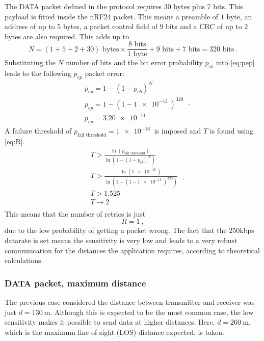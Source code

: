 The DATA packet defined in the protocol requires $30$ bytes plus $7$ bits. This payload is fitted inside the nRF24 packet. This means a preamble of $1$ byte, an address of up to $5$ bytes, a packet control field of $9$ bits and a CRC of up to $2$ bytes are also required. This adds up to
\begin{equation}
	N = \left( 1 + 5 + 2  + 30 \right)  \text{ bytes} \times \frac{8 \text{ bits}}{1 \text{ byte}} + 9 \text{ bits} + 7 \text{ bits} = 320 \text{ bits} \ .
\end{equation}
Substituting the $N$ number of bits and the bit error probability $p_{eb}$ into \eqref{eq:pep} leads to the following $p_{ep}$ packet error:
\begin{equation}
	\begin{split}
		& p_{ep} = 1 - \left( 1 - p_{eb} \right)^N \\
		& p_{ep} = 1 - \left( 1 - \SI{1e-13}{} \right)^{320} \\
		& p_{ep} = \SI{3.20e-11}{}
	\end{split} \ .
\end{equation}
A failure threshold of $p_{\text{fail threshold}} = \SI{1e-16}{}$ is imposed and $T$ is found using \eqref{eq:R}.
\begin{equation}
	\begin{split}
		& T > \frac{\ln \left( p_{\text{fail threshold}}  \right) }{\ln \left( 1 - \left( 1 - p_{eb} \right)^N \right) } \\
		& T > \frac{\ln \left( \SI{1e-16}{} \right) }{\ln \left( 1 - \left( 1 - \SI{1e-13}{} \right)^{320} \right) } \\
		& T > 1.525 \\
		& T \rightarrow 2 \\
	\end{split} \ .
\end{equation}
This means that the number of retries is just
\begin{equation}
	R = 1 \ ,
\end{equation}
due to the low probability of getting a packet wrong. The fact that the \SI{250}{}kbps datarate is set means the sensitivity is very low and leads to a very robust communication for the distances the application requires, according to theoretical calculations.



\subsubsection{DATA packet, maximum distance} \label{sub:data3}
The previous case considered the distance between transmitter and receiver was just $d = \SI{130}{\m}$. Although this is expected to be the most common case, the low sensitivity makes it possible to send data at higher distances. Here, $d = \SI{260}{\m}$, which is the maximum line of sight (LOS) distance expected, is taken.

